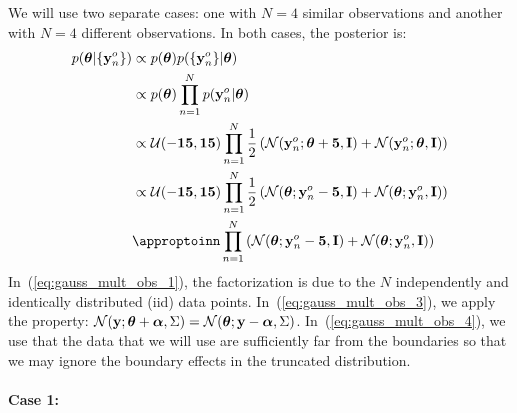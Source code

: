 We will use two separate cases: one with $N=4$ similar observations and another with $N=4$ different observations.
In both cases, the posterior is:
%
\begin{align}
  \label{eq:gauss_mult_obs}
  p(\thb|\{\data_n\}) &\propto p(\thb) p(\{\data_n\}|\thb) \\
                      &\propto p(\thb) \prod_{n=1}^{N} p(\data_n|\thb) \label{eq:gauss_mult_obs_1} \\
                      &\propto \mathcal{U}(-\mathbf{15},\mathbf{15}) \prod_{n=1}^{N} \dfrac{1}{2} \left ( \mathcal{N}(\data_n; \thb + \mathbf{5}, \mathbf{I}) + \mathcal{N}(\data_n; \thb, \mathbf{I}) \right ) \\
                      &\propto \mathcal{U}(-\mathbf{15},\mathbf{15}) \prod_{n=1}^{N} \dfrac{1}{2}\left ( \mathcal{N}(\thb; \data_n - \mathbf{5}, \mathbf{I}) + \mathcal{N}( \thb; \data_n, \mathbf{I}) \right ) \label{eq:gauss_mult_obs_3}\\
                      &\appropto \prod_{n=1}^{N} \left ( \mathcal{N}(\thb; \data_n - \mathbf{5}, \mathbf{I}) + \mathcal{N}( \thb; \data_n, \mathbf{I}) \right ) \label{eq:gauss_mult_obs_4}
\end{align}
In~(\ref{eq:gauss_mult_obs_1}), the factorization is due to the $N$ independently and identically distributed (iid) data points.
In~(\ref{eq:gauss_mult_obs_3}), we apply the property: $\mathcal{N}(\mathbf{y}; \boldsymbol{\theta} + \boldsymbol{\alpha}, \Sigma) = \mathcal{N}(\boldsymbol{\theta}; \mathbf{y} - \boldsymbol{\alpha}, \Sigma)$.
In~(\ref{eq:gauss_mult_obs_4}), we use that the data that we will use are sufficiently far from the boundaries so that we may ignore the boundary effects in the truncated distribution.

\paragraph{Case 1:}

